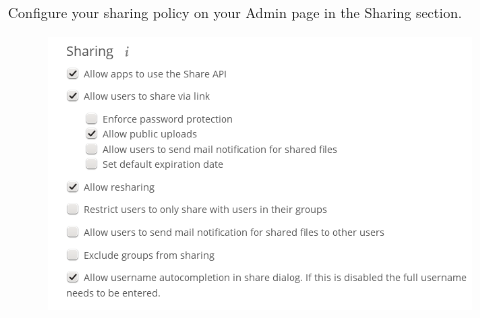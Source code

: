 \documentclass[letterpaper,10pt,english]{sphinxmanual}
\begin{document}
Configure your sharing policy on your Admin page in the Sharing section.
\begin{figure}[htbp]
\centering

\includegraphics{sharing-files-1.png}
\end{figure}
\end{document}
